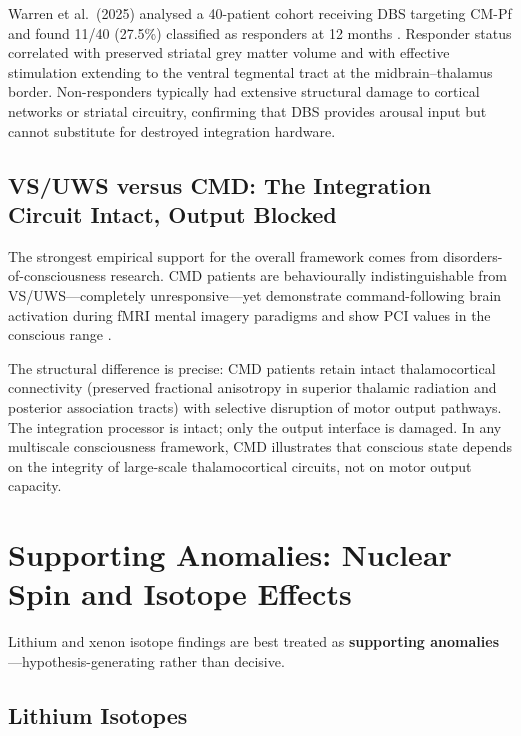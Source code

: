 \documentclass[10pt, a4paper, twocolumn]{article}
\begin{document}
Warren et al.\ (2025) analysed a 40-patient cohort receiving DBS
targeting CM-Pf and found 11/40 (27.5\%) classified as responders at 12
months \cite{warren2025}. Responder status correlated with preserved
striatal grey matter volume and with effective stimulation extending to
the ventral tegmental tract at the midbrain--thalamus border.
Non-responders typically had extensive structural damage to cortical
networks or striatal circuitry, confirming that DBS provides arousal
input but cannot substitute for destroyed integration hardware.

\subsection{VS/UWS versus CMD: The Integration Circuit Intact, Output
Blocked}

The strongest empirical support for the overall framework comes from
disorders-of-consciousness research. CMD patients are behaviourally
indistinguishable from VS/UWS---completely unresponsive---yet demonstrate
command-following brain activation during fMRI mental imagery paradigms
and show PCI values in the conscious range \cite{edlow2021}.

The structural difference is precise: CMD patients retain intact
thalamocortical connectivity (preserved fractional anisotropy in superior
thalamic radiation and posterior association tracts) with selective
disruption of motor output pathways. The integration processor is
intact; only the output interface is damaged. In any multiscale
consciousness framework, CMD illustrates that conscious state depends on
the integrity of large-scale thalamocortical circuits, not on motor
output capacity.

\section{Supporting Anomalies: Nuclear Spin and Isotope Effects}

Lithium and xenon isotope findings are best treated as
\textbf{supporting anomalies}---hypothesis-generating rather than
decisive.

\subsection{Lithium Isotopes}
\end{document}
